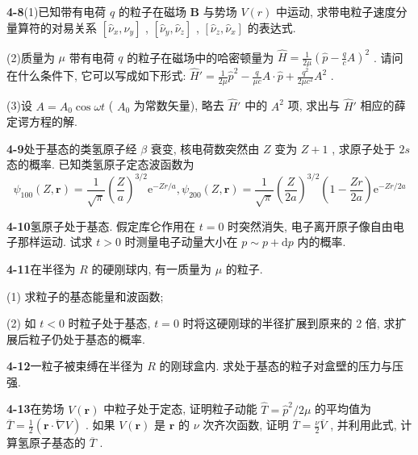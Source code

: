 \vfill

\newpage
\vfill

\noindent
\textbf{4-8}\quad (1)已知带有电荷 $q$ 的粒子在磁场 $\pmb{B}$ 与势场 $V(r)$ 中运动, 求带电粒子速度分量算符的对易关系 $[\hat{\nu}_x, \hat{\nu}_y]$ , $[\hat{\nu}_y, \hat{\nu}_z]$ , $[\hat{\nu}_z, \hat{\nu}_x]$ 的表达式. 

(2)质量为 $\mu$ 带有电荷 $q$ 的粒子在磁场中的哈密顿量为 $\hat{H} = \frac{1}{2\mu}\left(\hat{p} - \frac{q}{c} A\right)^2$ . 请问在什么条件下, 它可以写成如下形式: $\hat{H}' = \frac{1}{2\mu}\hat{p}^2 - \frac{q}{\mu c} A \cdot \hat{p} + \frac{q^2}{2\mu c^2} A^2$ . 

(3)设 $A = A_0 \cos \omega t$ ( $A_0$ 为常数矢量), 略去 $\hat{H}'$ 中的 $A^2$ 项, 求出与 $\hat{H}'$ 相应的薛定谔方程的解.

\vfill

\newpage
\vfill

\noindent
\textbf{4-9}\quad 处于基态的类氢原子经 $\beta$ 衰变, 核电荷数突然由 $Z$ 变为 $Z + 1$ , 求原子处于 $2s$ 态的概率. 已知类氢原子定态波函数为
$$
\psi_ {1 0 0} (Z, \boldsymbol {r}) = \frac {1}{\sqrt {\pi}} \left(\frac {Z}{a}\right) ^ {3 / 2} \mathrm{e} ^ {- Z r / a}, \psi_ {2 0 0} (Z, \boldsymbol {r}) = \frac {1}{\sqrt {\pi}} \left(\frac {Z}{2 a}\right) ^ {3 / 2} \left(1 - \frac {Z r}{2 a}\right) \mathrm{e} ^ {- Z r / 2 a}
$$

\vfill

\newpage
\vfill

\noindent
\textbf{4-10}\quad 氢原子处于基态. 假定库仑作用在 $t = 0$ 时突然消失, 电子离开原子像自由电子那样运动. 试求 $t > 0$ 时测量电子动量大小在 $p \sim p + \mathrm{d}p$ 内的概率.

\vfill

\newpage
\vfill

\noindent
\textbf{4-11}\quad 在半径为 $R$ 的硬刚球内, 有一质量为 $\mu$ 的粒子. 

(1) 求粒子的基态能量和波函数; 

(2) 如 $t < 0$ 时粒子处于基态, $t = 0$ 时将这硬刚球的半径扩展到原来的 2 倍, 求扩展后粒子仍处于基态的概率.

\vfill

\newpage
\vfill

\noindent
\textbf{4-12}\quad 一粒子被束缚在半径为 $R$ 的刚球盒内. 求处于基态的粒子对盒壁的压力与压强.

\vfill

\newpage
\vfill

\noindent
\textbf{4-13}\quad 在势场 $V(\pmb{r})$ 中粒子处于定态, 证明粒子动能 $\hat{T} = \hat{p}^2 / 2\mu$ 的平均值为 $\overline{T} = \frac{1}{2} (\overline{\pmb{r} \cdot \nabla V})$ . 如果 $V(\pmb{r})$ 是 $\pmb{r}$ 的 $\nu$ 次齐次函数, 证明 $\overline{T} = \frac{\nu}{2}\overline{V}$ , 并利用此式, 计算氢原子基态的 $\overline{T}$ .

